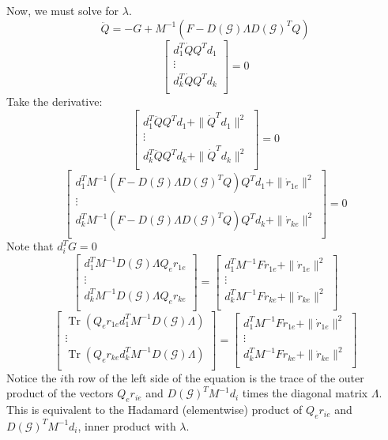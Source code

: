 \documentclass[conference]{IEEEtran}
\DeclareMathOperator{\Tr}{Tr}
\begin{document}
Now, we must solve for $\lambda$.
$$\ddot{Q}=-G+M^{-1}(F-D(\mathcal{G})\Lambda D(\mathcal{G})^TQ)$$
$$\begin{bmatrix}
    d_1^T\dot{Q}Q^Td_1\\
    \vdots\\
    d_k^T\dot{Q}Q^Td_k\\
\end{bmatrix}=0$$
Take the derivative:
$$\begin{bmatrix}
    d_1^T\ddot{Q}Q^Td_1+\|\dot{Q}^Td_1\|^2\\
    \vdots\\
    d_k^T\ddot{Q}Q^Td_k+\|\dot{Q}^Td_k\|^2\\
\end{bmatrix}=0$$
$$\begin{bmatrix}
    d_1^TM^{-1}(F-D(\mathcal{G})\Lambda D(\mathcal{G})^TQ)Q^Td_1+\|\dot{r}_{1e}\|^2\\
    \vdots\\
    d_k^TM^{-1}(F-D(\mathcal{G})\Lambda D(\mathcal{G})^TQ)Q^Td_k+\|\dot{r}_{ke}\|^2\\
\end{bmatrix}=0$$
Note that $d_i^TG=0$
$$\begin{bmatrix}
    d_1^TM^{-1}D(\mathcal{G})\Lambda Q_er_{1e}\\
    \vdots\\
    d_k^TM^{-1}D(\mathcal{G})\Lambda Q_er_{ke}\\
\end{bmatrix}=\begin{bmatrix}
    d_1^TM^{-1}Fr_{1e}+\|\dot{r}_{1e}\|^2\\
    \vdots\\
    d_k^TM^{-1}Fr_{ke}+\|\dot{r}_{ke}\|^2\\
\end{bmatrix}$$
$$\begin{bmatrix}
    \Tr\left(Q_er_{1e}d_1^TM^{-1}D(\mathcal{G})\Lambda\right)\\
    \vdots\\
    \Tr\left(Q_er_{ke}d_k^TM^{-1}D(\mathcal{G})\Lambda\right)\\
\end{bmatrix}=\begin{bmatrix}
    d_1^TM^{-1}Fr_{1e}+\|\dot{r}_{1e}\|^2\\
    \vdots\\
    d_k^TM^{-1}Fr_{ke}+\|\dot{r}_{ke}\|^2\\
\end{bmatrix}$$
Notice the $i$th row of the left side of the equation is the trace of the outer product of the vectors $Q_er_{ie}$ and $D(\mathcal{G})^TM^{-1}d_i$ times the diagonal matrix $\Lambda$. This is equivalent to the Hadamard (elementwise) product of $Q_er_{ie}$ and $D(\mathcal{G})^TM^{-1}d_i$, inner product with $\lambda$.
\end{document}
